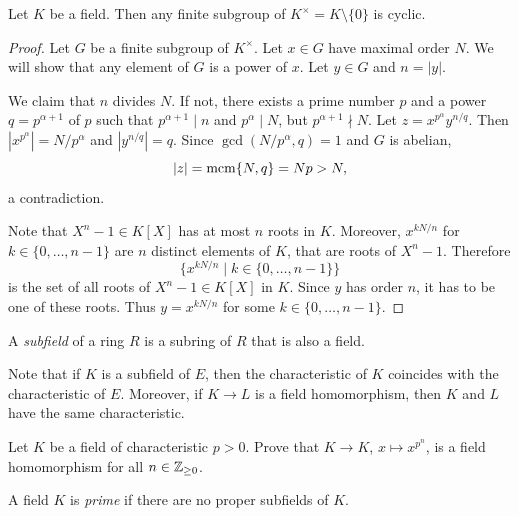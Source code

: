 \begin{proposition}
\label{pro:cyclic}
    Let $K$ be a field. Then any finite subgroup of  $K^\times=K\setminus\{0\}$ is cyclic. 
\end{proposition}

\begin{proof}
    Let $G$ be a finite subgroup of $K^\times$. Let 
    $x\in G$ have maximal order $N$. We will show that any element of 
    $G$ is a power of $x$. Let $y\in G$ and $n=|y|$. 
    
    We claim that $n$ divides $N$. If not, there exists
    a prime number $p$ and 
    a power $q=p^{\alpha+1}$ of $p$
    such that 
    $p^{\alpha+1}\mid n$ and $p^\alpha\mid N$, but $p^{\alpha+1}\nmid N$.
    Let $z=x^{p^\alpha}y^{n/q}$. Then $|x^{p^{\alpha}}|=N/p^{\alpha}$ and $|y^{n/q}|=q$. Since 
	$\gcd(N/p^{\alpha},q)=1$ and 
    $G$ is abelian, 
    \[
    |z|=\mathrm{mcm}\{N,q\}=Np>N,
    \]
    a contradiction. 

    Note that $X^n-1\in K[X]$ has at most $n$ roots in $K$. 
    Moreover, $x^{kN/n}$ for $k\in\{0,\dots,n-1\}$
    are $n$ distinct elements of $K$, 
    that are roots of $X^n-1$.
    Therefore 
    \[
    \{x^{kN/n}\mid k\in\{0,\dots,n-1\}\}
    \]
    is the set of all 
    roots of $X^n-1\in K[X]$ in $K$.
    Since $y$ has order $n$, it has to be one of these roots. Thus
    $y=x^{kN/n}$ for some $k\in\{0,\dots,n-1\}$. 
\end{proof}

\begin{definition}
	A \emph{subfield} of a ring $R$ is a subring of $R$ 
	that is also a field.
\end{definition}

Note that if $K$ is a subfield of $E$, then
the characteristic of $K$ coincides
with the characteristic 
of $E$. Moreover, if $K\to L$ is a field homomorphism, then
$K$ and $L$ have the same characteristic. 

\begin{exercise}
\label{xca: Frobenius hom}
	Let $K$ be a field of characteristic $p>0$. Prove
	that $K\to K$, $x\mapsto x^{p^n}$, is a field homomorphism
	for all $n\in\mathbb{Z}_{\geq 0}$. 
\end{exercise}

\begin{definition}
	A field $K$ is \emph{prime} if there are no
	proper subfields of $K$. 
\end{definition}

